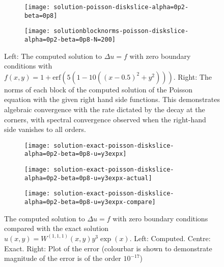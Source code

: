 \documentclass[11pt, oneside]{article}   	%
\newcommand{\Wiii}{W^{(1,1,1)}}
\begin{document}
\begin{figure}[t]
	\begin{subfigure}{0.3\textwidth}
	\texttt{[image: solution-poisson-diskslice-alpha=0p2-beta=0p8]}
	\centering
	\end{subfigure}
	\begin{subfigure}{0.5\textwidth}
	\centering
	\texttt{[image: solutionblocknorms-poisson-diskslice-alpha=0p2-beta=0p8-N=200]}
	\end{subfigure}
	\caption{Left: The computed solution to $\Delta u = f$ with zero boundary conditions with $f(x,y) = 1 + \text{erf}(5(1 - 10((x - 0.5)^2 + y^2)))$. Right: The norms of each block of the computed solution of the Poisson equation with the given right hand side functions. This demonstrates algebraic convergence with the rate dictated by the decay at the corners, with spectral convergence observed when the right-hand side vanishes to all orders.}
	\centering
	\label{fig:poisson}
\end{figure}

\begin{figure}[t]
	\begin{subfigure}{0.3\textwidth}
	\texttt{[image: solution-exact-poisson-diskslice-alpha=0p2-beta=0p8-u=y3expx]}
	\centering
	\end{subfigure}
	\begin{subfigure}{0.3\textwidth}
	\centering
	\texttt{[image: solution-exact-poisson-diskslice-alpha=0p2-beta=0p8-u=y3expx-actual]}
	\centering
	\end{subfigure}
	\begin{subfigure}{0.3\textwidth}
	\texttt{[image: solution-exact-poisson-diskslice-alpha=0p2-beta=0p8-u=y3expx-compare]}
	\centering
	\end{subfigure}
	\centering
	\caption{The computed solution to $\Delta u = f$ with zero boundary conditions compared with the exact solution $u(x,y) = \Wiii (x,y) y^3 \exp(x)$. Left: Computed. Centre: Exact. Right: Plot of the error (colourbar is shown to demonstrate magnitude of the error is of the order $10^{-17}$)}
	\centering
	\label{fig:poissonexact}
\end{figure}
\end{document}
